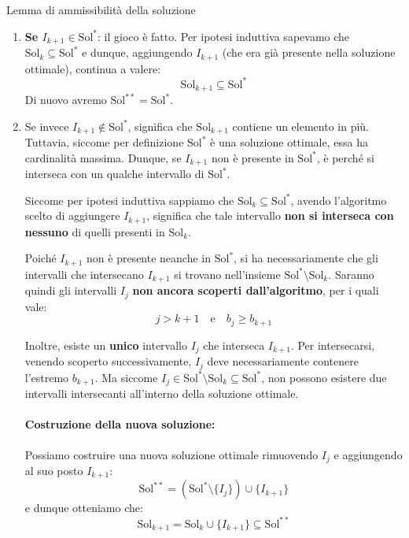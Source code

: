 \documentclass[12pt]{report}
\begin{document}
\begin{dimostrazione}{Lemma di ammissibilità della soluzione}{}
\begin{enumerate}
			\begin{enumerate}[label=\alph*)]
				\item \textbf{Se $I_{k+1} \in \text{Sol}^*$}: il gioco è fatto. Per ipotesi induttiva sapevamo che $\text{Sol}_k \subseteq \text{Sol}^*$ e dunque, aggiungendo $I_{k+1}$ (che era già presente nella soluzione ottimale), continua a valere:
				\[
				\text{Sol}_{k+1} \subseteq \text{Sol}^*
				\]
				Di nuovo avremo $\text{Sol}^{**} = \text{Sol}^*$.
				
				\item[\textbf{(b)}] Se invece $I_{k+1} \notin \text{Sol}^*$, significa che $\text{Sol}_{k+1}$ contiene un elemento in più. Tuttavia, siccome per definizione $\text{Sol}^*$ è una soluzione ottimale, essa ha cardinalità massima. Dunque, se $I_{k+1}$ non è presente in $\text{Sol}^*$, è perché si interseca con un qualche intervallo di $\text{Sol}^*$.
				
				Siccome per ipotesi induttiva sappiamo che $\text{Sol}_k \subseteq \text{Sol}^*$, avendo l'algoritmo scelto di aggiungere $I_{k+1}$, significa che tale intervallo \textbf{non si interseca con nessuno} di quelli presenti in $\text{Sol}_k$.
				
				Poiché $I_{k+1}$ non è presente neanche in $\text{Sol}^*$, si ha necessariamente che gli intervalli che intersecano $I_{k+1}$ si trovano nell'insieme $\text{Sol}^* \setminus \text{Sol}_k$. Saranno quindi gli intervalli $I_j$ \textbf{non ancora scoperti dall'algoritmo}, per i quali vale:
				\[
				j > k+1 \quad \text{e} \quad b_j \ge b_{k+1}
				\]
				
				Inoltre, esiste un \textbf{unico} intervallo $I_j$ che interseca $I_{k+1}$. Per intersecarsi, venendo scoperto successivamente, $I_j$ deve necessariamente contenere l'estremo $b_{k+1}$. Ma siccome $I_j \in \text{Sol}^* \setminus \text{Sol}_k \subseteq \text{Sol}^*$, non possono esistere due intervalli intersecanti all'interno della soluzione ottimale.
				
				\paragraph{Costruzione della nuova soluzione:}
				Possiamo costruire una nuova soluzione ottimale rimuovendo $I_j$ e aggiungendo al suo posto $I_{k+1}$:
				\[
				\text{Sol}^{**} = (\text{Sol}^* \setminus \{I_j\}) \cup \{I_{k+1}\}
				\]
				e dunque otteniamo che:
				\[
				\text{Sol}_{k+1} = \text{Sol}_k \cup \{I_{k+1}\} \subseteq \text{Sol}^{**}
				\]
			\end{enumerate}
		\end{enumerate}
	\end{dimostrazione}
	
\end{document}
